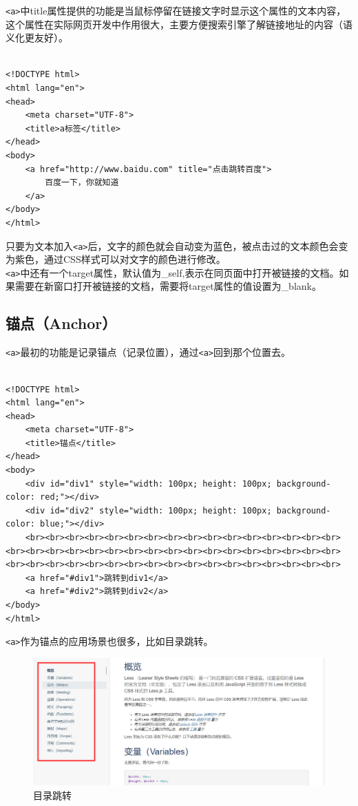 \lstinline|<a>|中title属性提供的功能是当鼠标停留在链接文字时显示这个属性的文本内容，这个属性在实际网页开发中作用很大，主要方便搜索引擎了解链接地址的内容（语义化更友好）。 \\

 \\
\begin{lstlisting}[style=htmlcssjs]
<!DOCTYPE html>
<html lang="en">
<head>
    <meta charset="UTF-8">
    <title>a标签</title>
</head>
<body>
    <a href="http://www.baidu.com" title="点击跳转百度">
        百度一下，你就知道
    </a>
</body>
</html>
\end{lstlisting}

只要为文本加入\lstinline|<a>|后，文字的颜色就会自动变为蓝色，被点击过的文本颜色会变为紫色，通过CSS样式可以对文字的颜色进行修改。 \\

\lstinline|<a>|中还有一个target属性，默认值为\_self,表示在同页面中打开被链接的文档。如果需要在新窗口打开被链接的文档，需要将target属性的值设置为\_blank。

\subsection{锚点（Anchor）}

\lstinline|<a>|最初的功能是记录锚点（记录位置），通过\lstinline|<a>|回到那个位置去。 \\

 \\
\begin{lstlisting}[style=htmlcssjs, breaklines=true, breakatwhitespace=false]
<!DOCTYPE html>
<html lang="en">
<head>
    <meta charset="UTF-8">
    <title>锚点</title>
</head>
<body>
    <div id="div1" style="width: 100px; height: 100px; background-color: red;"></div>
    <div id="div2" style="width: 100px; height: 100px; background-color: blue;"></div>
    <br><br><br><br><br><br><br><br><br><br><br><br><br><br><br><br><br><br><br><br><br><br><br><br><br><br><br><br><br><br><br><br><br><br><br><br><br><br><br><br><br><br><br><br><br><br><br><br><br><br>
    <a href="#div1">跳转到div1</a>
    <a href="#div2">跳转到div2</a>
</body>
</html>
\end{lstlisting}

\lstinline|<a>|作为锚点的应用场景也很多，比如目录跳转。

\begin{figure}[H]
    \centering
    \includegraphics[scale=0.35]{img/C3/3-4/1.png}
    \caption{目录跳转}
\end{figure}


